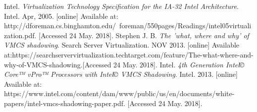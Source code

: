 \documentclass[onecolumn, draftclsnofoot,10pt, compsoc]{IEEEtran}
\begin{document}
\newpage
\begin{thebibliography}{6}

Intel. \textit{Virtualization Technology Specification for the IA-32 Intel Architecture}. Intel. Apr, 2005. [online] Available at:  http://dforeman.cs.binghamton.edu/~foreman/550pages/Readings/intel05virtualization.pdf. [Accessed 24 May. 2018].
Stephen J. B. \textit{The 'what, where and why' of VMCS shadowing}. Search Server Virtualization. NOV 2013. [online] Available at:https://searchservervirtualization.techtarget.com/feature/The-what-where-and-why-of-VMCS-shadowing.[Accessed 24 May. 2018].
Intel. \textit{4th Generation Intel© Core™ vPro™ Processors with Intel© VMCS Shadowing}. Intel. 2013. [online] Available at: https://www.intel.com/content/dam/www/public/us/en/documents/white-papers/intel-vmcs-shadowing-paper.pdf. [Accessed 24 May. 2018].

\end{thebibliography}


\end{document}
